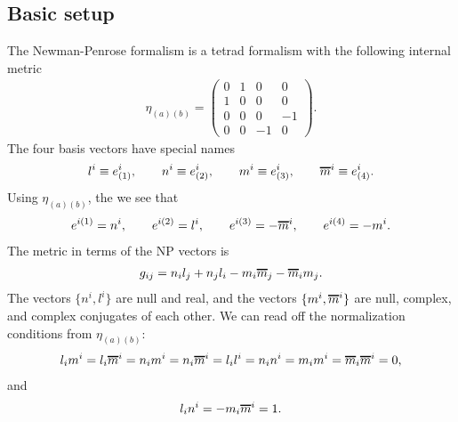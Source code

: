 \documentclass[12pt]{report}
\newcommand*\oline[1]{%
   \vbox{%
     \hrule height 1pt%
     \kern0.25ex%
     \hbox{%
       \ifmmode#1\else\ensuremath{#1}\fi%
     }
   }
}
\begin{document}
\subsection{Basic setup}
	The Newman-Penrose formalism is a tetrad formalism with
the following internal metric
\begin{align}
	\eta_{(a)(b)}
	=
	\begin{pmatrix}
	0 & 1 & 0 & 0 \\
	1 & 0 & 0 & 0 \\
	0 & 0 & 0 & -1 \\
	0 & 0 & -1 & 0 	
	\end{pmatrix}
	.
\end{align}
	The four basis vectors have special names
\begin{align}
	l^i
	\equiv
	e^i_{(1)}
	, \qquad
	n^i
	\equiv
	e^i_{(2)}
	, \qquad
	m^i
	\equiv
	e^i_{(3)}
	, \qquad
	\oline{m}^i
	\equiv
	e^i_{(4)}
	.
\end{align}
	Using $\eta_{(a)(b)}$, the we see that
\begin{align}
	e^{i(1)}
	=
	n^i
	, \qquad
	e^{i(2)}
	=
	l^i
	, \qquad
	e^{i(3)}
	=
	-\oline{m}^i
	, \qquad
	e^{i(4)}
	=
	-m^i
	.
\end{align}
	The metric in terms of the NP vectors is 
\begin{align}
	g_{ij}
	=
	n_il_j
+	n_jl_i
-	m_i\oline{m}_j
-	\oline{m}_im_j
	.
\end{align}
	The vectors $\{n^i,l^i\}$ are null and real,
and the vectors 
$\{m^i,\oline{m}^i\}$ are null, complex, and complex conjugates of
each other. We can read off the normalization conditions
from $\eta_{(a)(b)}$:
\begin{align}
	l_im^i=l_i\oline{m}^i=n_im^i=n_i\oline{m}^i
=	l_il^i=n_in^i=m_im^i=\oline{m}_i\oline{m}^i
=	0
	,
\end{align}
	and
\begin{align}
	l_in^i=-m_i\oline{m}^i=1
	.
\end{align}
\end{document}
